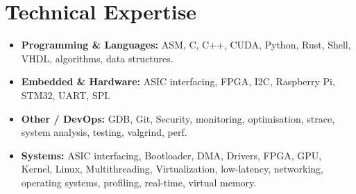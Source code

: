 \documentclass[9pt,a4paper]{article}
\begin{document}
\section*{Technical Expertise}
\begin{tcolorbox}[mybox]
\begin{itemize}
\item \textbf{Programming \& Languages:} ASM, C, C++, CUDA, Python, Rust, Shell, VHDL, algorithms, data structures.

\item \textbf{Embedded \& Hardware:} ASIC interfacing, FPGA, I2C, Raspberry Pi, STM32, UART, SPI.

\item \textbf{Other / DevOps:} GDB, Git, Security, monitoring, optimisation, strace, system analysis, testing, valgrind, perf.

\item \textbf{Systems:} ASIC interfacing, Bootloader, DMA, Drivers, FPGA, GPU, Kernel, Linux, Multithreading, Virtualization, low-latency, networking, operating systems, profiling, real-time, virtual memory.
\end{itemize}
\end{tcolorbox}
\end{document}
